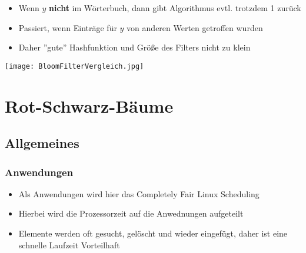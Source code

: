 			\begin{minipage}{0.5\textwidth}
				\begin{itemize}
					\item Wenn $y$ \textbf{nicht} im Wörterbuch, dann gibt Algorithmus evtl. trotzdem 1
						zurück
					\item Passiert, wenn Einträge für $y$ von anderen Werten getroffen wurden
					\item Daher ''gute'' Hashfunktion und Grö\ss e des Filters nicht zu klein
				\end{itemize}
			\end{minipage}
			\begin{minipage}{0.45\textwidth}
				\begin{center}
					\texttt{[image: BloomFilterVergleich.jpg]}
				\end{center}
			\end{minipage}



\newpage
\section{Rot-Schwarz-Bäume}
	\subsection{Allgemeines}
		\subsubsection{Anwendungen}
			\begin{itemize}
				\item Als Anwendungen wird hier das Completely Fair Linux Scheduling
				\item Hierbei wird die Prozessorzeit auf die Anwednungen aufgeteilt
				\item Elemente werden oft gesucht, gelöscht und wieder eingefügt, daher
					ist eine schnelle Laufzeit Vorteilhaft
			\end{itemize}


